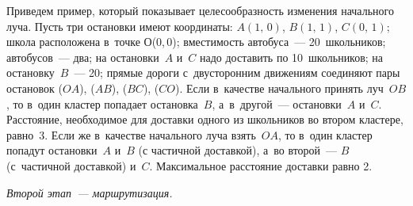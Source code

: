 \begin{multicols}{2}
     Приведем пример, который показывает целесообразность изменения
начального луча. Пусть три остановки имеют координаты: $A(1,\,0)$, $B(1,\,1)$,
$C(0,\,1)$; школа расположена в~точке О(0,\,0); вместимость автобуса~---
20~школьников; автобусов~--- два; на остановки~$A$ и~$C$ надо доставить по
10~школьников; на остановку~$B$~--- 20; прямые дороги с~двусторонним
движениям соединяют пары остановок ($OA$), ($AB$), ($BC$), ($CO$). Если в~качестве
начального принять луч~$OB$, то в~один кластер попадает остановка~$B$,
а~в~другой~--- остановки~$A$ и~$C$. Расстояние, необходимое для доставки одного
из школьников во втором кластере, равно~3. Если же в~качестве начального
луча взять~$OA$, то в~один кластер попадут остановки~$A$ и~$B$ (с частичной
доставкой), а~во второй~--- $B$ (с~частичной доставкой) и~$C$. Максимальное
расстояние доставки равно 2.

     \textit{Второй этап~--- маршрутизация.}


\end{multicols}
